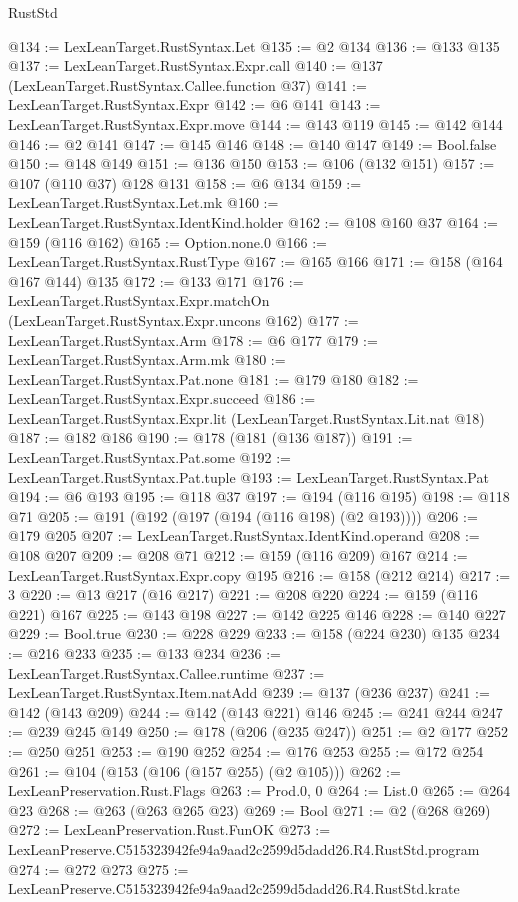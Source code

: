 \begin{lexlean}{RustStd}
\begin{coremodule}
@134 := LexLeanTarget.RustSyntax.Let
@135 := @2 @134
@136 := @133 @135
@137 := LexLeanTarget.RustSyntax.Expr.call
@140 := @137 (LexLeanTarget.RustSyntax.Callee.function @37)
@141 := LexLeanTarget.RustSyntax.Expr
@142 := @6 @141
@143 := LexLeanTarget.RustSyntax.Expr.move
@144 := @143 @119
@145 := @142 @144
@146 := @2 @141
@147 := @145 @146
@148 := @140 @147
@149 := Bool.false
@150 := @148 @149
@151 := @136 @150
@153 := @106 (@132 @151)
@157 := @107 (@110 @37) @128 @131
@158 := @6 @134
@159 := LexLeanTarget.RustSyntax.Let.mk
@160 := LexLeanTarget.RustSyntax.IdentKind.holder
@162 := @108 @160 @37
@164 := @159 (@116 @162)
@165 := Option.none.{0}
@166 := LexLeanTarget.RustSyntax.RustType
@167 := @165 @166
@171 := @158 (@164 @167 @144) @135
@172 := @133 @171
@176 := LexLeanTarget.RustSyntax.Expr.matchOn (LexLeanTarget.RustSyntax.Expr.uncons @162)
@177 := LexLeanTarget.RustSyntax.Arm
@178 := @6 @177
@179 := LexLeanTarget.RustSyntax.Arm.mk
@180 := LexLeanTarget.RustSyntax.Pat.none
@181 := @179 @180
@182 := LexLeanTarget.RustSyntax.Expr.succeed
@186 := LexLeanTarget.RustSyntax.Expr.lit (LexLeanTarget.RustSyntax.Lit.nat @18)
@187 := @182 @186
@190 := @178 (@181 (@136 @187))
@191 := LexLeanTarget.RustSyntax.Pat.some
@192 := LexLeanTarget.RustSyntax.Pat.tuple
@193 := LexLeanTarget.RustSyntax.Pat
@194 := @6 @193
@195 := @118 @37
@197 := @194 (@116 @195)
@198 := @118 @71
@205 := @191 (@192 (@197 (@194 (@116 @198) (@2 @193))))
@206 := @179 @205
@207 := LexLeanTarget.RustSyntax.IdentKind.operand
@208 := @108 @207
@209 := @208 @71
@212 := @159 (@116 @209) @167
@214 := LexLeanTarget.RustSyntax.Expr.copy @195
@216 := @158 (@212 @214)
@217 := 3
@220 := @13 @217 (@16 @217)
@221 := @208 @220
@224 := @159 (@116 @221) @167
@225 := @143 @198
@227 := @142 @225 @146
@228 := @140 @227
@229 := Bool.true
@230 := @228 @229
@233 := @158 (@224 @230) @135
@234 := @216 @233
@235 := @133 @234
@236 := LexLeanTarget.RustSyntax.Callee.runtime
@237 := LexLeanTarget.RustSyntax.Item.natAdd
@239 := @137 (@236 @237)
@241 := @142 (@143 @209)
@244 := @142 (@143 @221) @146
@245 := @241 @244
@247 := @239 @245 @149
@250 := @178 (@206 (@235 @247))
@251 := @2 @177
@252 := @250 @251
@253 := @190 @252
@254 := @176 @253
@255 := @172 @254
@261 := @104 (@153 (@106 (@157 @255) (@2 @105)))
@262 := LexLeanPreservation.Rust.Flags
@263 := Prod.{0, 0}
@264 := List.{0}
@265 := @264 @23
@268 := @263 (@263 @265 @23)
@269 := Bool
@271 := @2 (@268 @269)
@272 := LexLeanPreservation.Rust.FunOK
@273 := LexLeanPreserve.C515323942fe94a9aad2c2599d5dadd26.R4.RustStd.program
@274 := @272 @273
@275 := LexLeanPreserve.C515323942fe94a9aad2c2599d5dadd26.R4.RustStd.krate

\end{coremodule}
\end{lexlean}
